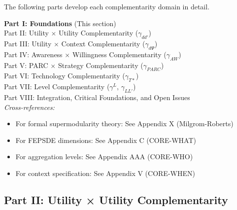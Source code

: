 The following parts develop each complementarity domain in detail.


\vspace{1cm}
\begin{tcolorbox}[colback=gray!10, colframe=gray!50, title=Appendix B Structure]
\textbf{Part I: Foundations} (This section) \\
Part II: Utility $\times$ Utility Complementarity ($\gamma_{dd'}$) \\
Part III: Utility $\times$ Context Complementarity ($\gamma_{d\Psi}$) \\
Part IV: Awareness $\times$ Willingness Complementarity ($\gamma_{AW}$) \\
Part V: PARC $\times$ Strategy Complementarity ($\gamma_{PARC}$) \\
Part VI: Technology Complementarity ($\gamma_{T*}$) \\
Part VII: Level Complementarity ($\gamma^L$, $\gamma_{LL'}$) \\
Part VIII: Integration, Critical Foundations, and Open Issues \\

\vspace{0.3cm}
\textit{Cross-references:}
\begin{itemize}
    \item For formal supermodularity theory: See Appendix X (Milgrom-Roberts)
    \item For FEPSDE dimensions: See Appendix C (CORE-WHAT)
    \item For aggregation levels: See Appendix AAA (CORE-WHO)
    \item For context specification: See Appendix V (CORE-WHEN)
\end{itemize}
\end{tcolorbox}



\subsection{Part II: Utility × Utility Complementarity}
\label{sec:B-utility-utility}

